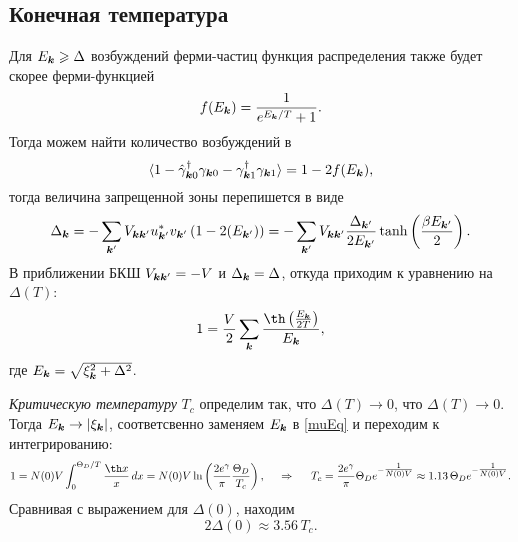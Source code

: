 \subsection*{Конечная температура}

Для $E_{{\boldsymbol{k}}} \geqslant \Delta$ возбуждений ферми-частиц функция распределения также будет скорее ферми-функцией
\begin{equation*}
	f(E_{{\boldsymbol{k}}}) = \frac{1}{e^{E_{{\boldsymbol{k}}}/T}+1}.
\end{equation*}
Тогда можем найти количество возбуждений в  
\begin{equation*}
	\langle 1 - \hat{\gamma}_{{\boldsymbol{k}}0}^{\dag} \gamma_{{\boldsymbol{k}}0} - \gamma_{{\boldsymbol{k}}1}^{\dag} \gamma_{{\boldsymbol{k}}1}\rangle = 1 - 2 f(E_{{\boldsymbol{k}}}),
\end{equation*}
тогда величина запрещенной зоны перепишется в виде
\begin{equation*}
	\Delta_{{\boldsymbol{k}}} = - \sum_{{\boldsymbol{k}}'} V_{{\boldsymbol{k}} {\boldsymbol{k}}'} u_{{\boldsymbol{k}}'}^* v_{{\boldsymbol{k}}'} \left(1 - 2(E_{{\boldsymbol{k}}'})\right) = - \sum_{{\boldsymbol{k}}'} V_{{\boldsymbol{k}} {\boldsymbol{k}}'} \frac{\Delta_{{\boldsymbol{k}}'}}{2 E_{{\boldsymbol{k}}'}} \tanh\left(
		\frac{\beta E_{{\boldsymbol{k}}'}}{2}
	\right).
\end{equation*}
В приближении БКШ $V_{{\boldsymbol{k}} {\boldsymbol{k}}'} = -V$ и $\Delta_{{\boldsymbol{k}}} = \Delta$, откуда приходим к уравнению на $\Delta(T)$:
\begin{equation}
	1 = \frac{V}{2} \sum_{\vc{k}} \frac{\th\left(\frac{E_{\vc{k}}}{2 T}\right)}{E_{\vc{k}}},
	\label{muEq}
\end{equation}
где $E_{{\boldsymbol{k}}} = \sqrt{\xi_{{\boldsymbol{k}}}^2 + \Delta^2}$.



\textit{Критическую температуру} $T_c$ определим так, что $\Delta(T) \to 0$, что $\Delta(T) \to 0$. Тогда
$E_{{\boldsymbol{k}}} \to |\xi_{{\boldsymbol{k}}}|$, соответсвенно заменяем $E_{{\boldsymbol{k}}}$ в \eqref{muEq} и переходим к интегрированию:
\begin{equation*}
	1 = N(0) V \int_{0}^{\Theta_D/T} \frac{\th x}{x} \d x = N(0) V \ln\left(
		\frac{2 e^{\gamma}}{\pi} \frac{\Theta_D}{T_c}
	\right),
	\hspace{0.5cm} \Rightarrow \hspace{0.5cm}
	T_c = \frac{2 e^{\gamma}}{\pi} \Theta_D e^{-\tfrac{1}{N(0) V}} \approx 1.13\, \Theta_D e^{-\tfrac{1}{N(0) V}}.
\end{equation*}
Сравнивая с выражением для $\Delta(0)$, находим
\begin{equation*}
	2 \Delta(0) \approx 3.56\, T_c.
\end{equation*}




